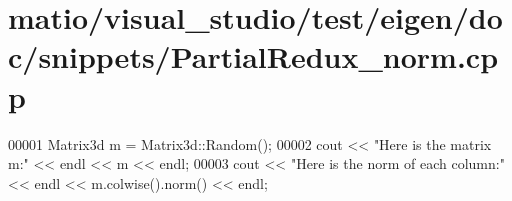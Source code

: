 \hypertarget{matio_2visual__studio_2test_2eigen_2doc_2snippets_2_partial_redux__norm_8cpp_source}{}\section{matio/visual\+\_\+studio/test/eigen/doc/snippets/\+Partial\+Redux\+\_\+norm.cpp}
\label{matio_2visual__studio_2test_2eigen_2doc_2snippets_2_partial_redux__norm_8cpp_source}

\begin{DoxyCode}
00001 Matrix3d m = Matrix3d::Random();
00002 cout << \textcolor{stringliteral}{"Here is the matrix m:"} << endl << m << endl;
00003 cout << \textcolor{stringliteral}{"Here is the norm of each column:"} << endl << m.colwise().norm() << endl;
\end{DoxyCode}
